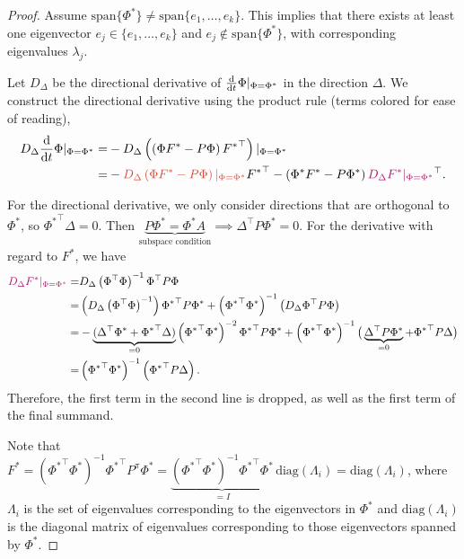 \begin{proof}
Assume $\mathrm{span}\{\Phi^*\} \neq \mathrm{span}\{e_1,\dots,e_k\}$. This implies that there exists at least one eigenvector $e_j \in \{e_1,\dots,e_k\}$ and $e_j \notin \mathrm{span}\{\Phi^*\}$, with corresponding eigenvalues $\lambda_j$.

Let $D_\Delta$ be the directional derivative of $\frac{\mathrm{d}}{\mathrm{d} t} \Phi |_{\Phi=\Phi^*}$ in the direction $\Delta$.
We construct the directional derivative using the product rule (terms colored for ease of reading),
\begin{align*}
D_\Delta \ddt{t} \Phi |_{\Phi=\Phi^*} = & -D_\Delta \left(\left(\Phi F^* - P \Phi\right) {F^*}^\top\right)|_{\Phi=\Phi^*}\\
     = & -{\color{uoftred}D_\Delta \left(\Phi F^* - P \Phi\right)|_{\Phi=\Phi^*}} {F^*}^\top - \left(\Phi^* F^* - P \Phi^*\right) {\color{uoftmagenta}D_\Delta {F^*}|_{\Phi=\Phi^*}}^\top.
\end{align*}

For the directional derivative, we only consider directions that are orthogonal to $\Phi^*$, so ${\Phi^*}^\top\Delta = 0$. Then $\underbrace{P{\Phi^*} = {\Phi^*} A}_{\text{subspace condition}} \implies \Delta^\top P \Phi^* = 0.$
For the derivative with regard to $F^*$, we have
\begin{align*}
    {\color{uoftmagenta}D_\Delta F^*|_{\Phi = \Phi^*}} =& D_\Delta \left(\Phi^\top \Phi\right)^{-1}\Phi^\top P \Phi\nonumber\\
    =& \left(D_\Delta \left(\Phi^\top \Phi\right)^{-1} \right) {\Phi^*}^\top P {\Phi^*} + \left({\Phi^*}^\top {\Phi^*}\right)^{-1} \left(D_\Delta \Phi^\top P \Phi  \right)\nonumber\\
    =& -\underbrace{(\Delta^\top \Phi^* + {\Phi^*}^\top \Delta)}_{=0}\left({\Phi^*}^\top {\Phi^*}\right)^{-2}{\Phi^*}^\top P {\Phi^*} + \left({\Phi^*}^\top {\Phi^*}\right)^{-1}\big(\underbrace{\Delta^\top P {\Phi^*}}_{=0} + {\Phi^*}^\top P \Delta\big)\nonumber\\
    =& \left({\Phi^*}^\top {\Phi^*}\right)^{-1}\left({\Phi^*}^\top P \Delta\right). \label{eq2}
\end{align*}
Therefore, the first term in the second line is dropped, as well as the first term of the final summand.

Note that $F^* = \left({\Phi^*}^\top{\Phi^*}\right)^{-1} {\Phi^*}^\top P^\pi {\Phi^*} = \underbrace{\left({\Phi^*}^\top{\Phi^*}\right)^{-1} {\Phi^*}^\top {\Phi^*}}_{=I}\, \mathrm{diag}(\Lambda_i) = \mathrm{diag}(\Lambda_i)$, where $\Lambda_i$ is the set of eigenvalues corresponding to the eigenvectors in $\Phi^*$ and $\mathrm{diag}(\Lambda_i)$ is the diagonal matrix of eigenvalues corresponding to those eigenvectors spanned by $\Phi^*$.


\end{proof}
